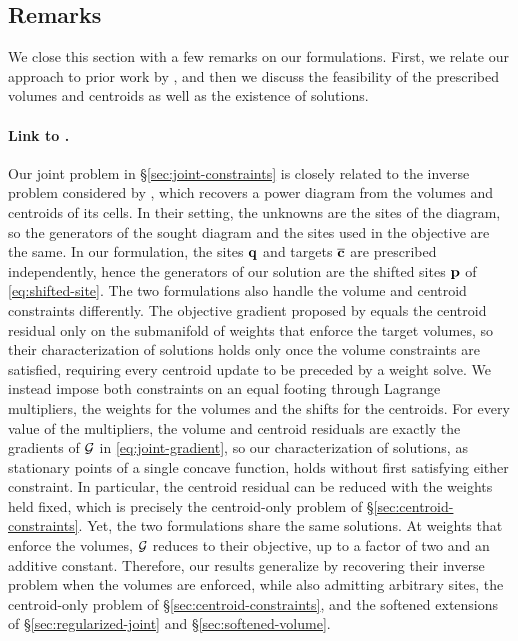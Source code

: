 \documentclass[main.tex]{subfiles}
\begin{document}
\subsection{Remarks}
\label{sec:remarks}

We close this section with a few remarks on our formulations.
First, we relate our approach to prior work by \citet{Bourne2025Inverting, Bourne2026ConvexOrder}, and then we discuss the feasibility of the prescribed volumes and centroids as well as the existence of solutions.

\paragraph{Link to \citet{Bourne2025Inverting}.}
Our joint problem in \S\ref{sec:joint-constraints} is closely related to the inverse problem considered by \citet{Bourne2025Inverting}, which recovers a power diagram from the volumes and centroids of its cells.
In their setting, the unknowns are the sites of the diagram, so the generators of the sought diagram and the sites used in the objective are the same.
In our formulation, the sites $\mathbf{q}$ and targets $\overline{\mathbf{c}}$ are prescribed independently, hence the generators of our solution are the shifted sites $\mathbf{p}$ of \eqref{eq:shifted-site}.
% 
The two formulations also handle the volume and centroid constraints differently.
The objective gradient proposed by \citet{Bourne2025Inverting} equals the centroid residual only on the submanifold of weights that enforce the target volumes, so their characterization of solutions holds only once the volume constraints are satisfied, requiring every centroid update to be preceded by a weight solve.
We instead impose both constraints on an equal footing through Lagrange multipliers, the weights for the volumes and the shifts for the centroids.
For every value of the multipliers, the volume and centroid residuals are exactly the gradients of $\mathcal{G}$ in \eqref{eq:joint-gradient}, so our characterization of solutions, as stationary points of a single concave function, holds without first satisfying either constraint.
In particular, the centroid residual can be reduced with the weights held fixed, which is precisely the centroid-only problem of \S\ref{sec:centroid-constraints}.
% 
Yet, the two formulations share the same solutions.
At weights that enforce the volumes, $\mathcal{G}$ reduces to their objective, up to a factor of two and an additive constant. %
Therefore, our results generalize \citet{Bourne2025Inverting} by recovering their inverse problem when the volumes are enforced, while also admitting arbitrary sites, the centroid-only problem of \S\ref{sec:centroid-constraints}, and the softened extensions of \S\ref{sec:regularized-joint} and \S\ref{sec:softened-volume}.
\end{document}
